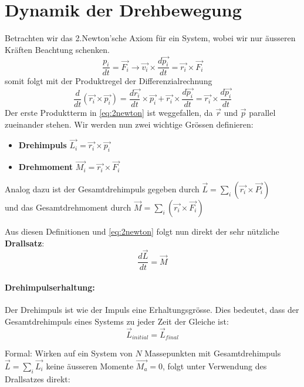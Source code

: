 \documentclass[12pt]{article}
\begin{document}
\newpage
\section{Dynamik der Drehbewegung}
Betrachten wir das 2.Newton'sche Axiom für ein System, wobei wir nur äusseren Kräften Beachtung schenken.
\begin{equation}
\dfrac{p_i}{dt} = \vec{F_i} \rightarrow \vec{v_i} \times \dfrac{d\vec{p_i}}{dt} = \vec{r_i} \times \vec{F_i}
\end{equation}
somit folgt mit der Produktregel der Differenzialrechnung
\begin{equation}
\dfrac{d}{dt} (\vec{r_i} \times \vec{p_i}) = \dfrac{d \vec{r_i}}{dt} \times \vec{p_i} + \vec{r_i} \times \dfrac{d \vec{p_i}}{dt} = \vec{r_i} \times \dfrac{d \vec{p_i}}{dt}
\label{eq:2newton}
\end{equation}
Der erste Produktterm in \cref{eq:2newton} ist weggefallen, da $\vec{r}$ und $\vec{p}$ parallel zueinander stehen.
Wir werden nun zwei wichtige Grössen definieren:

\begin{itemize}
\item \textbf{Drehimpuls} $\vec{L_i} = \vec{r_i} \times \vec{p_i}$
\item \textbf{Drehmoment} $\vec{M_i} = \vec{r_i} \times \vec{F_i}$
\end{itemize}
Analog dazu ist der Gesamtdrehimpuls gegeben durch $\vec{L} = \sum_{i} (\vec{r_i} \times \vec{P_i})$ \\ und das Gesamtdrehmoment durch $\vec{M} = \sum_{i} (\vec{r_i} \times \vec{F_i})$

Aus diesen Definitionen und \cref{eq:2newton} folgt nun direkt der sehr nützliche \textbf{Drallsatz}:
\begin{equation}
\dfrac{d\vec{L}}{dt} = \vec{M}
\end{equation}

\paragraph{Drehimpulserhaltung:}
Der Drehimpuls ist wie der Impuls eine Erhaltungsgrösse. Dies bedeutet, dass der Gesamtdrehimpuls eines Systems zu jeder Zeit der Gleiche ist: 
\begin{equation}
 \vec{L}_{initial} =\vec{L}_{final}
\end{equation}


Formal: Wirken auf ein System von $N$ Massepunkten mit Gesamtdrehimpuls $\vec{L} = \sum_{i} \vec{L_i}$ keine äusseren Momente $\vec{M_a} = 0$, folgt unter Verwendung des Drallsatzes direkt:
\end{document}
